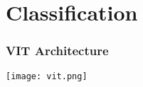 \documentclass[../presentation.tex]{subfiles} %
\begin{document}
\section{Classification}

\begin{frame}

    \frametitle{VIT Architecture}

    \vspace{-0.7cm}
    \begin{center}
        \texttt{[image: vit.png]}
    \end{center}
    \vspace{-0.4cm}

        


\end{frame}
\end{document}
